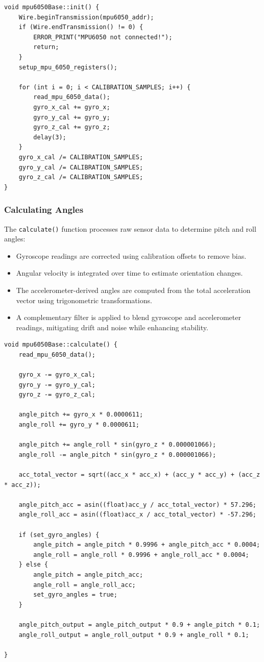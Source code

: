 \begin{lstlisting}[style=cppstyle2]
void mpu6050Base::init() {
	Wire.beginTransmission(mpu6050_addr);
	if (Wire.endTransmission() != 0) {
		ERROR_PRINT("MPU6050 not connected!");
		return;
	}
	setup_mpu_6050_registers();
	
	for (int i = 0; i < CALIBRATION_SAMPLES; i++) {
		read_mpu_6050_data();
		gyro_x_cal += gyro_x;
		gyro_y_cal += gyro_y;
		gyro_z_cal += gyro_z;
		delay(3);
	}
	gyro_x_cal /= CALIBRATION_SAMPLES;
	gyro_y_cal /= CALIBRATION_SAMPLES;
	gyro_z_cal /= CALIBRATION_SAMPLES;
}
\end{lstlisting}

\subsubsection{Calculating Angles}
The \texttt{calculate()} function processes raw sensor data to determine pitch and roll angles:
\begin{itemize}
	\item Gyroscope readings are corrected using calibration offsets to remove bias.
	\item Angular velocity is integrated over time to estimate orientation changes.
	\item The accelerometer-derived angles are computed from the total acceleration vector using trigonometric transformations.
	\item A complementary filter is applied to blend gyroscope and accelerometer readings, mitigating drift and noise while enhancing stability.
\end{itemize}

\begin{lstlisting}[style=cppstyle2]
void mpu6050Base::calculate() {
	read_mpu_6050_data();
	
	gyro_x -= gyro_x_cal;
	gyro_y -= gyro_y_cal;
	gyro_z -= gyro_z_cal;
	
	angle_pitch += gyro_x * 0.0000611;
	angle_roll += gyro_y * 0.0000611;
	
	angle_pitch += angle_roll * sin(gyro_z * 0.000001066);
	angle_roll -= angle_pitch * sin(gyro_z * 0.000001066);
	
	acc_total_vector = sqrt((acc_x * acc_x) + (acc_y * acc_y) + (acc_z * acc_z));
	
	angle_pitch_acc = asin((float)acc_y / acc_total_vector) * 57.296;
	angle_roll_acc = asin((float)acc_x / acc_total_vector) * -57.296;
	
	if (set_gyro_angles) {
		angle_pitch = angle_pitch * 0.9996 + angle_pitch_acc * 0.0004;
		angle_roll = angle_roll * 0.9996 + angle_roll_acc * 0.0004;
	} else {
		angle_pitch = angle_pitch_acc;
		angle_roll = angle_roll_acc;
		set_gyro_angles = true;
	}
	
	angle_pitch_output = angle_pitch_output * 0.9 + angle_pitch * 0.1;
	angle_roll_output = angle_roll_output * 0.9 + angle_roll * 0.1;
	
}
\end{lstlisting}



